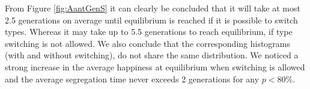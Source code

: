 From Figure \ref{fig:AantGenS} it can clearly be concluded that it will take at most 2.5 generations on average until equilibrium is reached if it is possible to switch types. Whereas it may take up to 5.5 generations to reach equilibrium, if type switching is not allowed. We also conclude that the corresponding histograms (with and without switching), do not share the same distribution.
We noticed a strong increase in the average happiness at equilibrium when switching is allowed and the average segregation time never exceeds 2 generations for any \(p<80\%\).